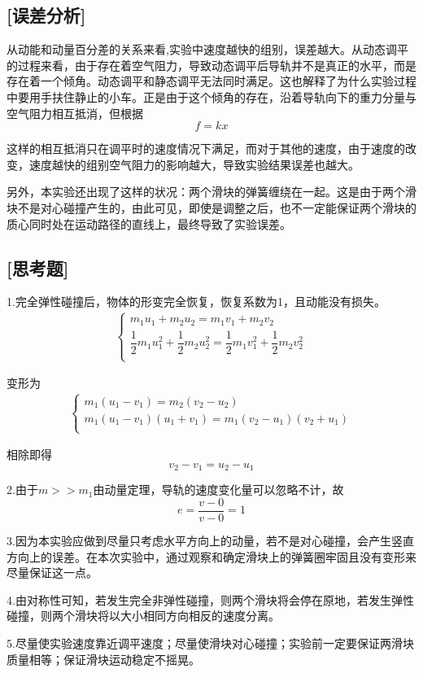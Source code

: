 \documentclass[UTF8]{article}
\begin{document}
  	\subsection*{[误差分析]}
  	\par 从动能和动量百分差的关系来看,实验中速度越快的组别，误差越大。从动态调平的过程来看，由于存在着空气阻力，导致动态调平后导轨并不是真正的水平，而是存在着一个倾角。动态调平和静态调平无法同时满足。这也解释了为什么实验过程中要用手扶住静止的小车。正是由于这个倾角的存在，沿着导轨向下的重力分量与空气阻力相互抵消，但根据
  	\[f=kx\]
  	\par 这样的相互抵消只在调平时的速度情况下满足，而对于其他的速度，由于速度的改变，速度越快的组别空气阻力的影响越大，导致实验结果误差也越大。
  	\par
  	\par 另外，本实验还出现了这样的状况：两个滑块的弹簧缠绕在一起。这是由于两个滑块不是对心碰撞产生的，由此可见，即使是调整之后，也不一定能保证两个滑块的质心同时处在运动路径的直线上，最终导致了实验误差。
  	\subsection*{[思考题]}
  	\par 1.完全弹性碰撞后，物体的形变完全恢复，恢复系数为1，且动能没有损失。
  	\begin{align*}
		\begin{cases}
  			m_1u_1+m_2u_2=m_1v_1+m_2v_2 \\
  			\dfrac{1}{2}m_1u_1^2+\dfrac{1}{2}m_2u_2^2=\dfrac{1}{2}m_1v_1^2+\dfrac{1}{2}m_2v_2^2 \\
  		\end{cases}
  	\end{align*}
  	\par 变形为
  	\begin{align*}
  		\begin{cases}
  			m_1(u_1-v_1)=m_2(v_2-u_2)\\
  			m_1(u_1-v_1)(u_1+v_1)=m_1(v_2-u_1)(v_2+u_1)
  			 \\
  		\end{cases}
  	\end{align*}
  \par 相除即得
  \[v_2-v_1=u_2-u_1\]
  \par 2.由于$m>>m_1$由动量定理，导轨的速度变化量可以忽略不计，故
  \[e=\frac{v-0}{v-0}=1\]
  \par 3.因为本实验应做到尽量只考虑水平方向上的动量，若不是对心碰撞，会产生竖直方向上的误差。在本次实验中，通过观察和确定滑块上的弹簧圈牢固且没有变形来尽量保证这一点。
  \par 4.由对称性可知，若发生完全非弹性碰撞，则两个滑块将会停在原地，若发生弹性碰撞，则两个滑块将以大小相同方向相反的速度分离。
  \par 5.尽量使实验速度靠近调平速度；尽量使滑块对心碰撞；实验前一定要保证两滑块质量相等；保证滑块运动稳定不摇晃。
  	
\end{document}
